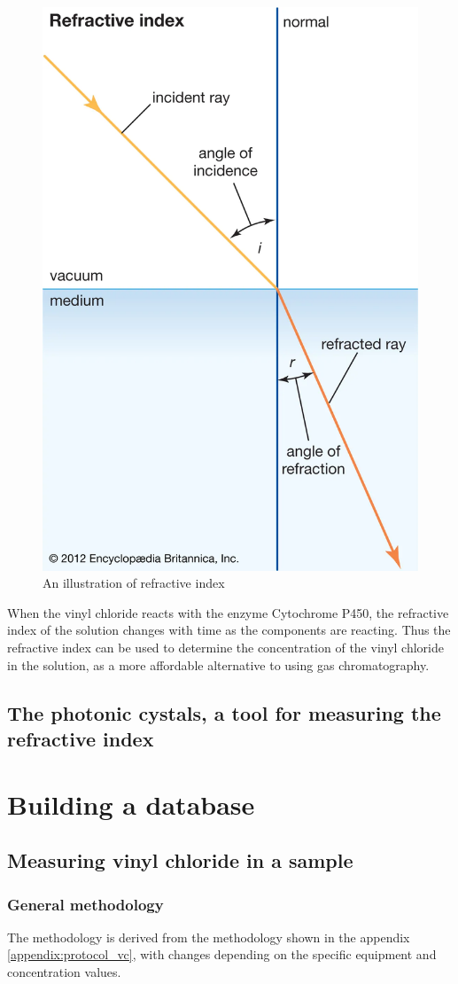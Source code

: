 \documentclass{article}
\begin{document}
\begin{figure}[H]
    \centering
    \includegraphics[width=0.5\linewidth]{refractive_index.png}
    \caption{An illustration of refractive index\cite{ri_britannica}}
    \label{fig:ri}
\end{figure}

When the vinyl chloride reacts with the enzyme Cytochrome P450, the refractive index of the solution changes with time as the components are reacting\cite{roana_vc_ri}.
Thus the refractive index can be used to determine the concentration of the vinyl chloride in the solution, as a more affordable alternative to using gas chromatography.

\subsection{The photonic cystals, a tool for measuring the refractive index}

\newpage
\section{Building a database}
\subsection{Measuring vinyl chloride in a sample}
\subsubsection{General methodology}

The methodology is derived from the methodology shown in the appendix \ref{appendix:protocol_vc}, with changes depending on the specific equipment and concentration values.\\
\end{document}
